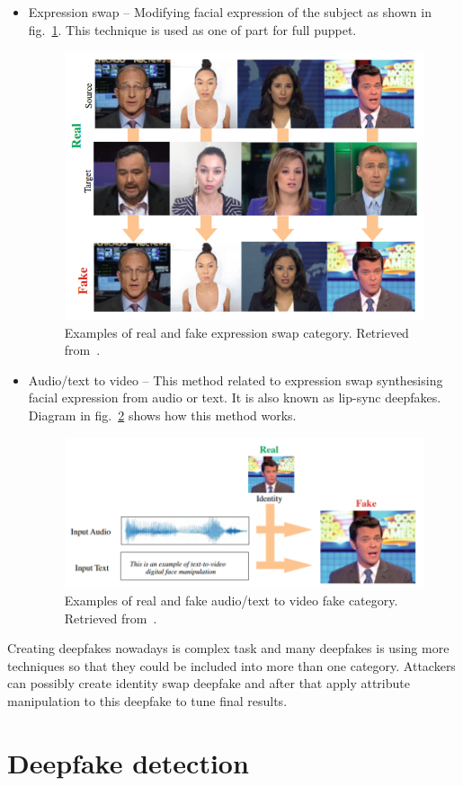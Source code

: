 \begin{itemize}
\item Expression swap – Modifying facial expression of the subject as shown in fig.~\ref{fig:expression_swap}. This technique is used as one of part for full puppet.
\begin{figure}[H]
    \centering
    \includegraphics[width=.52\linewidth]{other-fig/expression_swap.png}
    \caption{Examples of real and fake expression swap category. Retrieved from~\cite{IntroductionToDigitalFaceManipulation}.}
\label{fig:expression_swap}
\end{figure}

\item Audio/text to video – This method related to expression swap synthesising facial expression from audio or text. It is also known as lip-sync deepfakes. Diagram in fig.~\ref{fig:audio_to_video} shows how this method works.
\begin{figure}[H]
    \centering
    \includegraphics[width=.6\linewidth]{other-fig/audio_to_video.png}
    \caption{Examples of real and fake audio/text to video fake category. Retrieved from~\cite{IntroductionToDigitalFaceManipulation}.}
\label{fig:audio_to_video}
\end{figure}
\end{itemize}

Creating deepfakes nowadays is complex task and many deepfakes is using more techniques so that they could be included into more than one category. Attackers can possibly create identity swap deepfake and after that apply attribute manipulation to this deepfake to tune final results.

\chapter{Deepfake detection}
\label{chapter:deepfake_detectoin}

